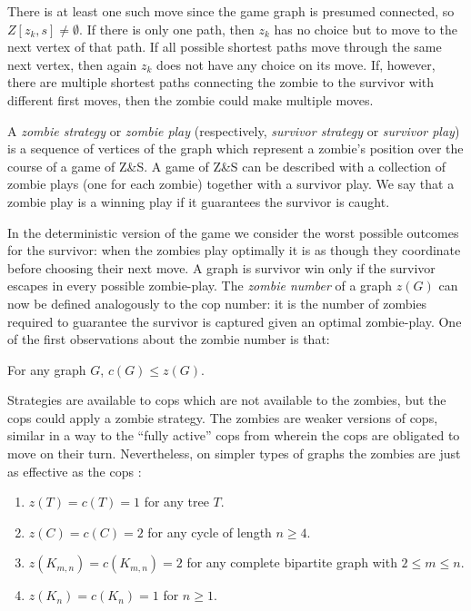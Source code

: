 There is at least one such move since the game graph is presumed connected,
so $Z[z_k,s] \neq \emptyset$. If there is only one path, then $z_k$ has no choice but to move to the next vertex of that path. If all possible shortest paths move through the same next vertex, then again $z_k$ does not have any choice on its move. If, however, there are multiple shortest paths connecting the zombie to the survivor with different first moves, then the zombie could make multiple moves.

A \textit{zombie strategy} or \textit{zombie play} (respectively, \textit{survivor strategy} or \textit{survivor play}) is a sequence of vertices of the graph which represent a zombie's position over the course of a game of Z\&S. A game of Z\&S can be described with a collection of zombie plays (one for each zombie) together with a survivor play. We say that a zombie play is a winning play if it guarantees the survivor is caught.

In the deterministic version of the game we consider the worst possible outcomes for the survivor: when the zombies play optimally it is as though they coordinate before choosing their next move. A graph is survivor win only if the survivor escapes in every possible zombie-play.
The \textit{zombie number} of a graph $z(G)$ can now be defined analogously to the cop number: it is the number of zombies required to guarantee the survivor is captured given an optimal zombie-play.
One of the first observations \cite{fitzpatrick2016deterministic} about the zombie number is that:

\begin{lemma}
For any graph $G$, $c(G) \leq z(G)$.
\end{lemma}

Strategies are available to cops which are not available to the zombies, but the cops could apply a zombie strategy. The zombies are weaker versions of cops, similar in a way to the ``fully active'' cops from \cite{gromovikov2018fully} wherein the cops are obligated to move on their turn. Nevertheless, on simpler types of graphs the zombies are just as effective as the cops \cite{fitzpatrick2016deterministic}:

\begin{observation}
  \begin{enumerate}
    \item $z(T) = c(T) = 1$ for any tree $T$.
    \item $z(C) = c(C) = 2$ for any cycle of length $n \geq 4$.
    \item $z(K_{m,n}) = c(K_{m,n}) = 2$ for any complete bipartite graph with $2 \leq m \leq n$.
    \item $z(K_n) = c(K_n) = 1$ for $n \geq 1$.
  \end{enumerate}
\end{observation}

